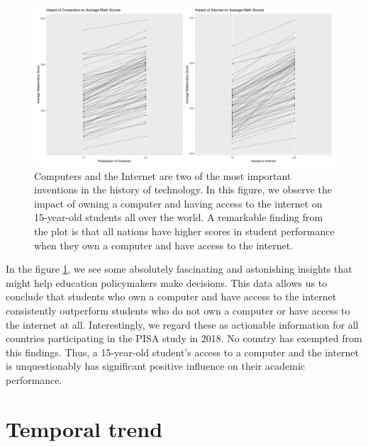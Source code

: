 \begin{Schunk}
\begin{figure}[H]
\includegraphics[width=1\linewidth]{learningtower_files/figure-latex/compint-plot-1} \caption[Computers and the Internet are two of the most important inventions in the history of technology]{Computers and the Internet are two of the most important inventions in the history of technology. In this figure, we observe the impact of owning a computer and having access to the internet on 15-year-old students all over the world. A remarkable finding from the plot is that all nations have higher scores in student performance when they own a computer and have access to the internet.}\label{fig:compint-plot}
\end{figure}
\end{Schunk}

In the figure \ref{fig:compint-plot}, we see some absolutely fascinating
and astonishing insights that might help education policymakers make
decisions. This data allows us to conclude that students who own a
computer and have access to the internet consistently outperform
students who do not own a computer or have access to the internet at
all. Interestingly, we regard these as actionable information for all
countries participating in the PISA study in 2018. No country has
exempted from this findings. Thus, a 15-year-old student's access to a
computer and the internet is unquestionably has significant positive
influence on their academic performance.

\hypertarget{temporal-trend}{%
\section{Temporal trend}\label{temporal-trend}}

